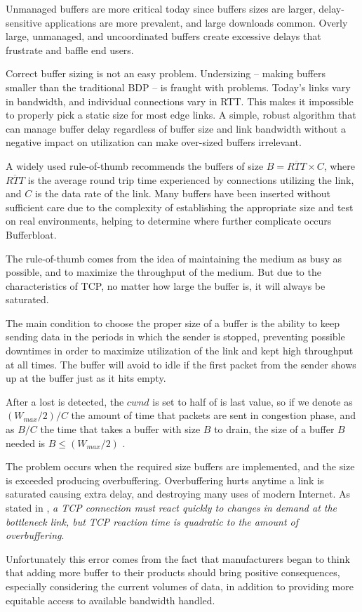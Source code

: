 Unmanaged buffers are more critical today since buffers sizes are larger,
delay-sensitive applications are more prevalent, and large downloads common.
Overly large, unmanaged, and uncoordinated buffers create excessive delays
that frustrate and baffle end users.

Correct buffer sizing is not an easy problem. Undersizing -- making buffers
smaller than the traditional BDP -- is fraught with problems. Today's links vary
in bandwidth, and individual connections vary in RTT. This makes it impossible
to properly pick a static size for most edge links. A simple, robust algorithm
that can manage buffer delay regardless of buffer size and link bandwidth
without a negative impact on utilization can make over-sized buffers
irrelevant.

A widely used rule-of-thumb recommends the buffers of size $B = \overline{RTT}
\times C $, where $\overline{RTT}$ is the average round trip time experienced by
connections utilizing the link, and $C$ is the data rate of the link. Many
buffers have been inserted without sufficient care due to the complexity of
establishing the appropriate size and test on real environments\cite{Vu-Brugier},
helping to determine where further complicate occurs Bufferbloat.

The rule-of-thumb comes from the idea of maintaining the medium as
busy as possible, and to maximize the throughput of the medium. But due to the
characteristics of TCP, no matter how large the buffer is, it will always be
saturated.

The main condition to choose the proper size of a buffer is the ability to
keep sending data in the periods in which the sender is stopped, preventing
possible downtimes in order to maximize utilization of the link and kept high
throughput at all times. The buffer will avoid to idle if the first packet
from the sender shows up at the buffer just as it hits empty.

After a lost is detected, the $cwnd$ is set to half of is last value, so if we
denote as $(W_{max} /2)/C$ the amount of time that packets are sent in
congestion phase, and as $B/C$ the time that takes a buffer with size $B$ to
drain, the size of a buffer $B$ needed is $B \leq (W_{max} /2)$
\cite{main:ref:1}.

The problem occurs when the required size buffers are implemented, and the
size is exceeded producing overbuffering. Overbuffering hurts anytime a link
is saturated causing extra delay, and destroying many uses of modern Internet.
As stated in \cite{GettysNichols}, \textit{a TCP connection must react quickly
to changes in demand at the bottleneck link, but TCP reaction time is
quadratic to the amount of overbuffering}.

Unfortunately this error comes from the fact that manufacturers began to think
that adding more buffer to their products should bring positive consequences,
especially considering the current volumes of data, in addition to providing
more equitable access to available bandwidth handled.
